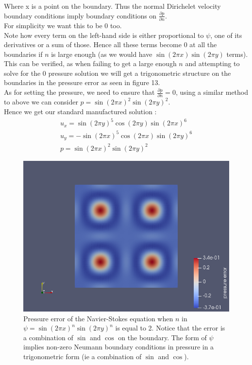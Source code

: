 \documentclass[11pt,twoside,a4paper]{article}
\begin{document}
Where x is a point on the boundary.
Thus the normal Dirichelet velocity boundary conditions imply boundary conditions on $\frac{\partial p}{\partial n}$.\\
For simplicity we want this to be $0$ too.\\
Note how every term on the left-hand side is either proportional to $\psi$, one of its derivatives or a sum of those. Hence all these terms become $0$ at all the boundaries if $n$ is large enough (as we would have $ \sin(2 \pi x) \sin(2 \pi y)$ terms).\\
This can be verified, as when failing to get a large enough $n$ and attempting to solve for the $0$ pressure solution we will get a trigonometric structure on the boundaries in the pressure error as seen in figure 13.\\
As for setting the pressure, we need to ensure that $\frac{\partial p} {\partial n} = 0$, using a similar method to above we can consider $p =  \sin(2 \pi x)^2 \sin(2 \pi y)^2$.\\
Hence we get our standard manufactured solution :
\begin{align}
u_x = \sin(2 \pi y)^5 \cos(2 \pi y)\sin(2 \pi x)^6 \\
u_y= -\sin(2 \pi x)^5 \cos(2 \pi x) \sin(2 \pi y)^6 \\
p = \sin(2 \pi x)^2 \sin(2 \pi y)^2
\end{align}

\begin{figure}
  \includegraphics[width=\linewidth]{badpbdc.png}
  \caption{Pressure error of the Navier-Stokes equation when $n$ in $\psi = \sin(2 \pi x)^n \sin(2 \pi y)^n$  is equal to 2. Notice that the error is a combination of $\sin$ and $\cos$ on the boundary. The form of $\psi$ implies non-zero Neumann boundary conditions in pressure in a trigonometric form (ie a combination of $\sin$  and $\cos$).}
\end{figure}
\end{document}
